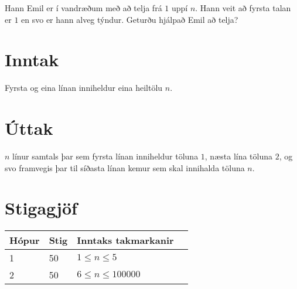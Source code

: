 Hann Emil er í vandræðum með að telja frá $1$ uppí $n$. Hann veit að fyrsta talan er $1$ en svo er hann alveg týndur. Geturðu hjálpað Emil að telja?

\section*{Inntak}
Fyrsta og eina línan inniheldur eina heiltölu $n$.

\section*{Úttak}
$n$ línur samtals þar sem fyrsta línan inniheldur töluna $1$, næsta lína töluna $2$, og svo framvegis þar til síðasta línan kemur sem skal innihalda töluna $n$.

\section*{Stigagjöf}
\begin{tabular}{|l|l|l|l|}
\hline
Hópur & Stig & Inntaks takmarkanir \\ \hline
    1 &   50 & $1 \leq n \leq 5$ \\ \hline
    2 &   50 & $6 \leq n \leq 100000$ \\ \hline
\end{tabular}
